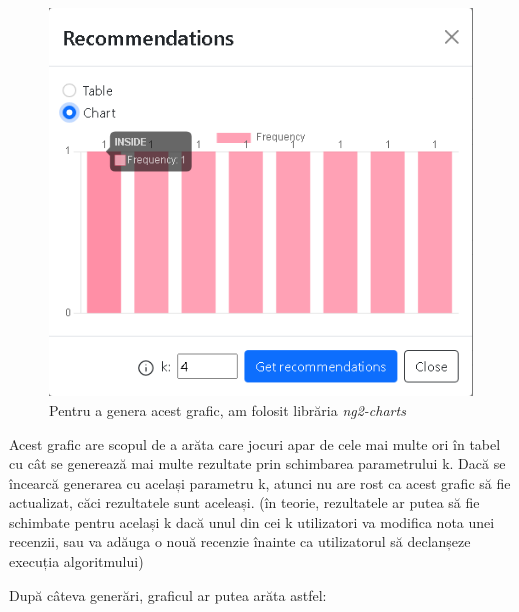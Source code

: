 \documentclass[12pt,a4paper]{report}
\begin{document}
\begin{figure}[H]
\centering
\caption{}
\begin{adjustbox}{max size={\textwidth}{\textheight}}
\includegraphics[scale=0.7]{exemplu_39_modal_3}
\end{adjustbox}
\caption*{Pentru a genera acest grafic, am folosit librăria \emph{ng2-charts} \cite{36} }
\end{figure}

Acest grafic are scopul de a arăta care jocuri apar de cele mai multe ori în tabel cu cât se generează mai multe rezultate prin schimbarea parametrului k. Dacă se încearcă generarea cu același parametru k, atunci nu are rost ca acest grafic să fie actualizat, căci rezultatele sunt aceleași. (în teorie, rezultatele ar putea să fie schimbate pentru același k dacă unul din cei k utilizatori va modifica nota unei recenzii, sau va adăuga o nouă recenzie înainte ca utilizatorul să declanșeze execuția algoritmului)

După câteva generări, graficul ar putea arăta astfel:
\end{document}
